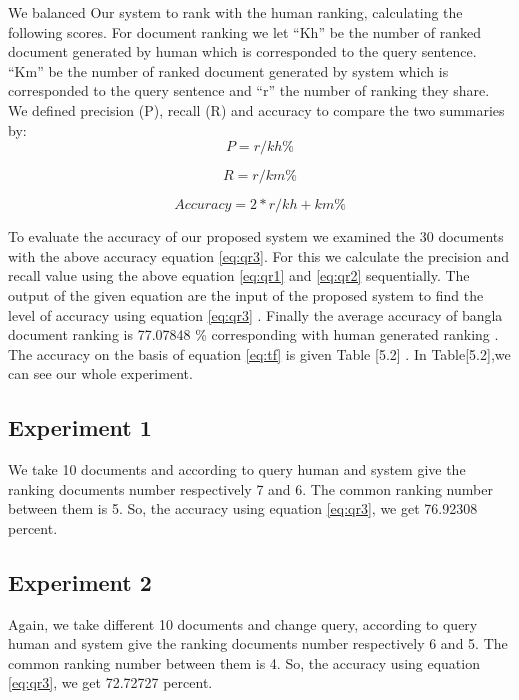 We balanced Our system to rank with the human ranking, calculating the following scores. For document ranking we let  “Kh”  be the number of ranked document generated by human which is corresponded to the query sentence. “Km” be the number of ranked document generated by system which is corresponded to the query sentence and  “r” the number of ranking they share. We defined precision (P), recall (R) and accuracy to compare the two summaries by:\\

\begin{equation}
	P =  r/kh \%
\label{eq:qr1}
\end{equation}


\begin{equation}
	R =  r/km \%
\label{eq:qr2}
\end{equation}

\begin{equation}
Accuracy =  2*r / kh + km \%
\label{eq:qr3}
\end{equation}


To evaluate the accuracy of our proposed system we examined the 30 documents with the above accuracy equation \ref{eq:qr3}. For this we calculate the precision and recall value using the above equation \ref{eq:qr1} and \ref{eq:qr2} sequentially. The output of the given equation are the  input of the proposed system to find the level of accuracy using equation \ref{eq:qr3} . Finally the average accuracy of bangla document ranking is 77.07848 \% corresponding with human generated ranking . The accuracy on the basis of equation \ref{eq:tf} is given Table [5.2] . 
In Table[5.2],we can see our whole experiment.
      

\subsection{Experiment 1}

We take 10 documents and according to query human and system give the ranking documents number respectively 7 and 6. The common ranking number between them is 5. So, the accuracy using equation \ref{eq:qr3}, we get 76.92308 percent.

\subsection{Experiment 2}

Again, we take different 10 documents and change query, according to query human and system give the ranking documents number respectively 6 and 5. The common ranking number between them is 4. So, the accuracy using equation \ref{eq:qr3}, we get 72.72727 percent.

